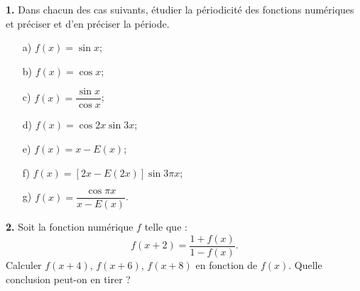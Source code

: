 \documentclass{article}
\begin{document}

\bigskip

\textbf{1.} Dans chacun des cas suivants, étudier la périodicité des fonctions numériques et préciser et d’en préciser la période.

\begin{itemize}
    \item[a)] \( f(x) = \sin x \);
    \item[b)] \( f(x) = \cos x \);
    \item[c)] \( f(x) = \dfrac{\sin x}{\cos x} \);
    \item[d)] \( f(x) = \cos 2x \sin 3x \);
    \item[e)] \( f(x) = x - E(x) \);
    \item[f)] \( f(x) = [2x - E(2x)] \sin 3\pi x \);
    \item[g)] \( f(x) = \dfrac{\cos \pi x}{x - E(x)} \).
\end{itemize}

\bigskip

\textbf{2.} Soit la fonction numérique \( f \) telle que :
\[
f(x + 2) = \dfrac{1 + f(x)}{1 - f(x)}.
\]
Calculer \( f(x + 4) \), \( f(x + 6) \), \( f(x + 8) \) en fonction de \( f(x) \).  
Quelle conclusion peut-on en tirer ?
\end{document}
